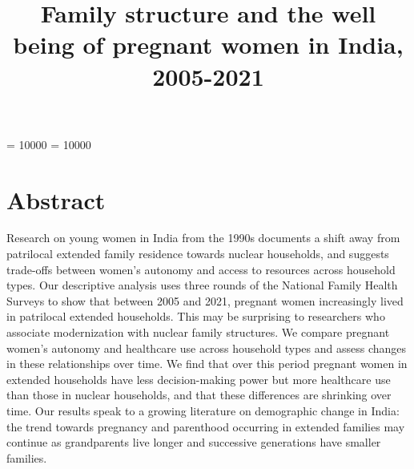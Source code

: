 \documentclass[10pt,twoside,reqno]{article}
\title{Family structure and the well being of pregnant women in India, 2005-2021}
\date{}
\begin{document}
\onehalfspacing
\widowpenalty = 10000
\clubpenalty = 10000

\setlength{\parskip}{0ex}
\setlength{\parindent}{.7cm}
\setlength{\bibsep}{.18cm}
\setlength{\belowdisplayskip}{15pt} \setlength{\belowdisplayshortskip}{10pt}
\setlength{\abovedisplayskip}{15pt} \setlength{\abovedisplayshortskip}{10pt}


\maketitle
\thispagestyle{plain}


					
\maketitle
\thispagestyle{plain}



\section*{Abstract}
Research on young women in India from the 1990s documents a shift away from patrilocal extended family residence towards nuclear households, and suggests trade-offs between women’s autonomy and access to resources across household types.  Our descriptive analysis uses three rounds of the National Family Health Surveys to show that between 2005 and 2021, pregnant women increasingly lived in patrilocal extended households.  This may be surprising to researchers who associate modernization with nuclear family structures.  We compare pregnant women’s autonomy and healthcare use across household types and assess changes in these relationships over time.  We find that over this period pregnant women in extended households have less decision-making power but more healthcare use than those in nuclear households, and that these differences are shrinking over time. Our results speak to a growing literature on demographic change in India: the trend towards pregnancy and parenthood occurring in extended families may continue as grandparents live longer and successive generations have smaller families.
 
\vspace*{12pt}

\setlength{\parskip}{0ex}

\pagestyle{fancy}
\setcounter{footnote}{\autorzahl}
\end{document}
